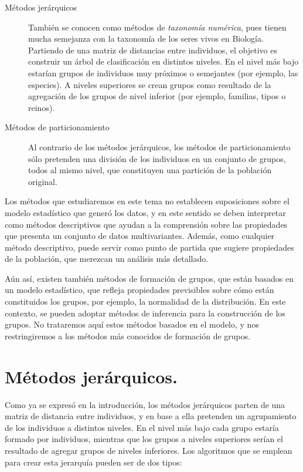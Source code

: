 \documentclass[
  a4paper,
  oneside]{scrbook}
\theoremstyle{definition}
\theoremstyle{definition}
\theoremstyle{definition}
\theoremstyle{definition}
\theoremstyle{remark}
\begin{document}
\begin{description}
\item[Métodos jerárquicos]
También se conocen como métodos de \emph{taxonomía numérica}, pues tienen
mucha semejanza con la taxonomía de los seres vivos en Biología.
Partiendo de una matriz de distancias entre individuos, el objetivo
es construir un árbol de clasificación en distintos niveles. En el
nivel más bajo estarían grupos de individuos muy próximos o
semejantes (por ejemplo, las especies). A niveles superiores se
crean grupos como resultado de la agregación de los grupos de nivel
inferior (por ejemplo, familias, tipos o reinos).
\item[Métodos de particionamiento]
Al contrario de los métodos jerárquicos, los métodos de
particionamiento sólo pretenden una división de los individuos en un
conjunto de grupos, todos al mismo nivel, que constituyen una
partición de la población original.
\end{description}

Los métodos que estudiaremos en este tema no establecen suposiciones
sobre el modelo estadístico que generó los datos, y en este sentido se
deben interpretar como métodos descriptivos que ayudan a la comprensión
sobre las propiedades que presenta un conjunto de datos multivariantes.
Además, como cualquier método descriptivo, puede servir como punto de
partida que sugiere propiedades de la población, que merezcan un
análisis más detallado.

Aún así, existen también métodos de formación de grupos, que están
basados en un modelo estadístico, que refleja propiedades previsibles
sobre cómo están constituidos los grupos, por ejemplo, la normalidad de
la distribución. En este contexto, se pueden adoptar métodos de
inferencia para la construcción de los grupos. No trataremos aquí estos
métodos basados en el modelo, y nos restringiremos a los métodos más
conocidos de formación de grupos.

\section{Métodos jerárquicos.}\label{metodos-jerarquicos}

Como ya se expresó en la introducción, los métodos jerárquicos parten de
una matriz de distancia entre individuos, y en base a ella pretenden un
agrupamiento de los individuos a distintos niveles. En el nivel más bajo
cada grupo estaría formado por individuos, mientras que los grupos a
niveles superiores serían el resultado de agregar grupos de niveles
inferiores. Los algoritmos que se emplean para crear esta jerarquía
pueden ser de dos tipos:
\end{document}
